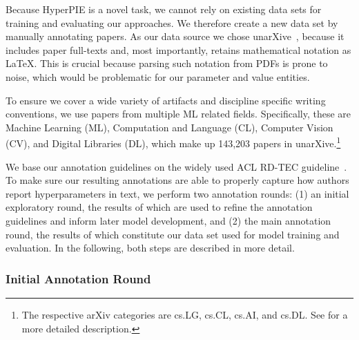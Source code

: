 Because HyperPIE is a novel task, we cannot rely on existing data sets for training and evaluating our approaches. We therefore create a new data set by manually annotating papers. As our data source we chose unarXive~\cite{Saier2023unarXive}, because it includes paper full-texts and, most importantly, retains mathematical notation as \LaTeX{}. This is crucial because parsing such notation from PDFs is prone to noise, which would be problematic for our parameter and value entities.  %

To ensure we cover a wide variety of artifacts and discipline specific writing conventions, we use papers from multiple ML related fields. Specifically, these are Machine Learning (ML), Computation and Language (CL), Computer Vision (CV), and Digital Libraries (DL), which make up 143,203 papers in unarXive.\footnote{The respective arXiv categories are cs.LG, cs.CL, cs.AI, and cs.DL. See  for a more detailed description.}

We base our annotation guidelines on the widely used ACL RD-TEC guideline~\cite{Qasemizadeh2016}. To make sure our resulting annotations are able to properly capture how authors report hyperparameters in text, we perform two annotation rounds: (1) an initial exploratory round, the results of which are used to refine the annotation guidelines and inform later model development, and (2) the main annotation round, the results of which constitute our data set used for model training and evaluation. In the following, both steps are described in more detail.

\subsubsection{Initial Annotation Round}\label{sec:exploreannot}


